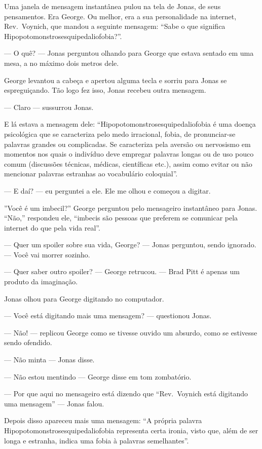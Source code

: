 Uma janela de mensagem instantânea pulou na tela de Jonas,  de seus pensamentos. Era George. Ou melhor, era a sua personalidade na internet, Rev.~Voynich, que mandou a seguinte mensagem: ``Sabe o que significa Hipopotomonstrosesquipedaliofobia?''.

--- O quê? --- Jonas perguntou olhando para George que estava sentado em uma mesa, a no máximo dois metros dele.

George levantou a cabeça e apertou alguma tecla e sorriu para Jonas se espreguiçando. Tão logo fez isso, Jonas recebeu outra mensagem.

--- Claro --- sussurrou Jonas.

E lá estava a mensagem dele: ``Hipopotomonstrosesquipedaliofobia é uma doença psicológica que se caracteriza pelo medo irracional, fobia, de pronunciar-se palavras grandes ou complicadas. Se caracteriza pela aversão ou nervosismo em momentos nos quais o indivíduo deve empregar palavras longas ou de uso pouco comum (discussões técnicas, médicas, científicas etc.), assim como evitar ou não mencionar palavras estranhas ao vocabulário coloquial''.

--- E daí? --- eu perguntei a ele. Ele me olhou e começou a digitar.

''Você é um imbecil?'' George perguntou pelo mensageiro instantâneo para Jonas. ``Não,'' respondeu ele, ``imbecis são pessoas que preferem se comunicar pela internet do que pela vida real''.

--- Quer um spoiler sobre sua vida, George? --- Jonas perguntou, sendo ignorado. --- Você vai morrer sozinho.

--- Quer saber outro spoiler? ---  George retrucou. --- Brad Pitt é apenas um produto da imaginação.

Jonas olhou para George digitando no computador.

--- Você está digitando mais uma mensagem? --- questionou Jonas.

--- Não! --- replicou George como se tivesse ouvido um absurdo, como se estivesse sendo ofendido.

--- Não minta --- Jonas disse.

--- Não estou mentindo --- George disse em tom zombatório.

--- Por que aqui no mensageiro está dizendo que ``Rev.~Voynich está digitando uma mensagem'' --- Jonas falou.

Depois disso apareceu mais uma mensagem: ``A própria palavra Hipopotomonstrosesquipedaliofobia representa certa ironia, visto que, além de ser longa e estranha, indica uma fobia à palavras semelhantes''.


